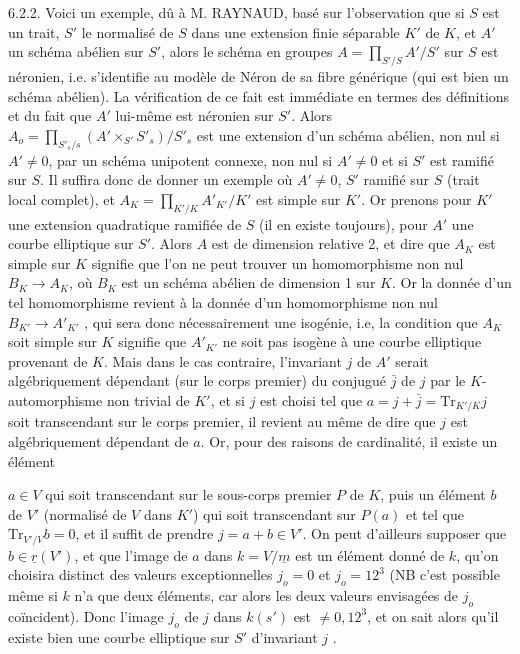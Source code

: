 6.2.2. Voici un exemple, dû à M. RAYNAUD, basé sur l'observation que si $S$ est un trait, $S'$ le normalisé de $S$ dans une extension finie séparable $K'$ de $K$, et $A'$ un schéma abélien sur $S'$, alors le schéma en groupes $A = \prod_{S'/S} A'/S'$ sur $S$ est néronien, i.e. s'identifie au modèle de Néron de sa fibre générique (qui est bien un schéma abélien). La vérification de ce fait est immédiate en termes des définitions et du fait que $A'$ lui-même est néronien sur $S'$. Alors $A_o = \prod_{S'_s/s}(A' \times_{S'} S'_s)/S'_s$ est une extension d'un schéma abélien, non nul si $A' \neq 0$, par un schéma unipotent connexe, non nul si $A' \neq 0$ et si $S'$ est ramifié sur $S$. Il suffira donc de donner un exemple où $A' \neq 0$, $S'$ ramifié sur $S$ (trait local complet), et $A_K = \prod_{K'/K} A'_{K'}/K'$ est simple sur $K'$. Or prenons pour $K'$ une extension quadratique ramifiée de $S$ (il en existe toujours), pour $A'$ une courbe elliptique sur $S'$. Alors $A$ est de dimension relative 2, et dire que $A_K$ est simple sur $K$ signifie que l'on ne peut trouver un homomorphisme non nul $B_K \longrightarrow A_K$, où $B_K$ est un schéma abélien de dimension 1 sur $K$. Or la donnée d'un tel homomorphisme revient à la donnée d'un homomorphisme non nul $B_{K'} \longrightarrow A'_{K'}$ , qui sera donc nécessairement une isogénie, i.e, la condition que $A_K$ soit simple sur $K$ signifie que $A'_{K'}$ ne soit pas isogène à une courbe elliptique provenant de $K$. Mais dans le cas contraire, l'invariant $j$ de $A'$ serait algébriquement dépendant (sur le corps premier) du conjugué $\bar{j}$ de $j$ par le $K$-automorphisme non trivial de $K'$, et si $j$ est choisi tel que $a = j + \bar{j} = \mathrm{Tr}_{K'/K} j$ soit transcendant sur le corps premier, il revient au même de dire que $j$ est algébriquement dépendant de $a$. Or, pour des raisons de cardinalité, il existe un élément



$a \in V$ qui soit transcendant sur le sous-corps premier $P$ de $K$, puis un élément $b$ de $V'$ (normalisé de $V$ dans $K'$) qui soit transcendant sur $P(a)$ et tel que $\mathrm{Tr}_{V'/V} b = 0$, et il suffit de prendre $j = a + b \in V'$. On peut d'ailleurs supposer que $b \in \underline{r}(V')$, et que l'image de $a$ dans $k = V/\underline{m}$ est un élément donné de $k$, qu'on choisira distinct des valeurs exceptionnelles $j_o = 0$ et $j_o = 12^3$ (NB c'est possible même si $k$ n'a que deux éléments, car alors les deux valeurs envisagées de $j_o$ coïncident). Donc l'image $j_o$ de $j$ dans $k(s')$ est $\neq 0,12^3$, et on sait alors qu'il existe bien une courbe elliptique sur $S'$ d'invariant $j$ .

